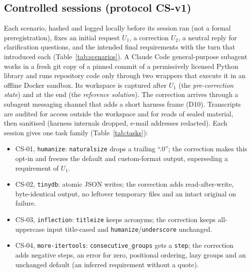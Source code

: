 \subsection{Controlled sessions (protocol CS-v1)}
\label{sec:controlled}
Each scenario, hashed and logged locally before its session ran (not a formal preregistration), fixes an initial request $U_1$, a correction $U_2$, a neutral reply for clarification questions, and the intended final requirements with the turn that introduced each (Table~\ref{tab:scenarios}). A Claude Code general-purpose subagent works in a fresh git copy of a pinned commit of a permissively licensed Python library and runs repository code only through two wrappers that execute it in an offline Docker sandbox. Its workspace is captured after $U_1$ (the \emph{pre-correction state}) and at the end (the \emph{reference solution}). The correction arrives through a subagent messaging channel that adds a short harness frame (D10). Transcripts are audited for access outside the workspace and for reads of sealed material, then sanitised (harness internals dropped, e-mail addresses redacted). Each session gives one task family (Table~\ref{tab:tasks}):
\begin{itemize}
\item CS-01, \texttt{humanize}: \texttt{naturalsize} drops a trailing ``.0''; the correction makes this opt-in and freezes the default and custom-format output, superseding a requirement of $U_1$.
\item CS-02, \texttt{tinydb}: atomic JSON writes; the correction adds read-after-write, byte-identical output, no leftover temporary files and an intact original on failure.
\item CS-03, \texttt{inflection}: \texttt{titleize} keeps acronyms; the correction keeps all-uppercase input title-cased and \texttt{humanize}/\texttt{underscore} unchanged.
\item CS-04, \texttt{more-itertools}: \texttt{consecutive\_groups} gets a \texttt{step}; the correction adds negative steps, an error for zero, positional ordering, lazy groups and an unchanged default (an inferred requirement without a quote).
\end{itemize}

